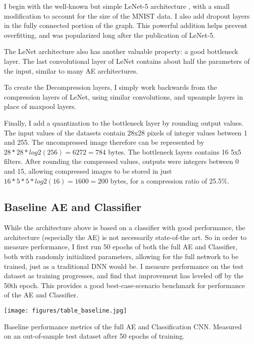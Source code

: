 \documentclass[twoside,11pt]{article}
\begin{document}
I begin with the well-known but simple LeNet-5 architecture %
, with a small modification to account for the size of the MNIST data.
I also add dropout layers in the fully connected portion of the graph. 
This powerful addition helps prevent overfitting, and was popularized long
after the publication of LeNet-5. %

The LeNet architecture also has another valuable property: a good bottleneck layer.
The last convolutional layer of LeNet contains about half the parameters of the input,
similar to many AE architectures. 

To create the Decompression layers, I simply work backwards from the compression layers of LeNet,
using similar convolutions, and upsample layers in place of maxpool layers.

Finally, I add a quantization to the bottleneck layer by rounding output values. %
The input values of the datasets contain 28x28 pixels of integer values between 1 and 255.
The uncompressed image therefore can be represented by $28*28*log2(256) = 6272 = 784$ bytes.
The bottleneck layers contains 16 5x5 filters. 
After rounding the compressed values, outputs were integers between 0 and 15,
allowing compressed images to be stored in just $16*5*5*log2(16) = 1600 = 200$ bytes,
for a compression ratio of 25.5\%. 


\subsection{Baseline AE and Classifier}

While the architecture above is based on a classifier with good performance,
the architecture (especially the AE) is not necessarily state-of-the art. 
So in order to measure performance, I first run 50 epochs of both the full AE and Classifier,
both with randomly initialized parameters, allowing for the full network to be trained,
just as a traditional DNN would be. I measure performance on the test dataset as training progresses,
and find that improvement has leveled off by the 50th epoch.
This provides a good best-case-scenario benchmark for performance of the AE and Classifier. 

\begin{table}
  \centering
  \texttt{[image: figures/table\_baseline.jpg]}
  \caption{Baseline performance metrics of the full AE and Classification CNN. 
   Measured on an out-of-sample test dataset after 50 epochs of training.}
  \label{table:base}
\end{table}
\end{document}
